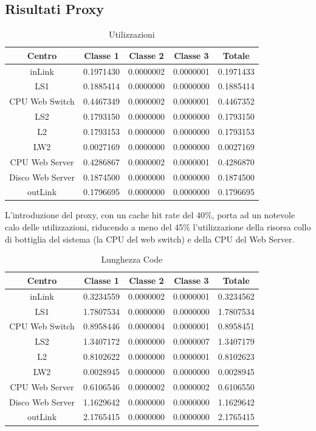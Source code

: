 \subsection{Risultati Proxy}
\begin{table}[htbp]
\begin{center}
\begin{tabular}{|c|c|c|c|c|}
\hline
Centro	&Classe 1	&Classe 2	&Classe 3	&Totale\\
\hline
\hline
inLink & 0.1971430 & 0.0000002 & 0.0000001 & 0.1971433 \\ \hline
LS1 & 0.1885414 & 0.0000000 & 0.0000000 & 0.1885414 \\ \hline
CPU Web Switch & 0.4467349 & 0.0000002 & 0.0000001 & 0.4467352 \\ \hline
LS2 & 0.1793150 & 0.0000000 & 0.0000000 & 0.1793150 \\ \hline
L2 & 0.1793153 & 0.0000000 & 0.0000000 & 0.1793153 \\ \hline
LW2 & 0.0027169 & 0.0000000 & 0.0000000 & 0.0027169 \\ \hline
CPU Web Server & 0.4286867 & 0.0000002 & 0.0000001 & 0.4286870 \\ \hline
Disco Web Server & 0.1874500 & 0.0000000 & 0.0000000 & 0.1874500 \\ \hline
outLink & 0.1796695 & 0.0000000 & 0.0000000 & 0.1796695 \\ \hline
\end{tabular}
\end{center}
\caption{Utilizzazioni}
\label{utilizzazioni}
\end{table}
L'introduzione del proxy, con un cache hit rate del 40\%, porta ad un notevole calo delle utilizzazioni, riducendo a meno del 45\% l'utilizzazione della risorsa collo di bottiglia del sistema (la CPU del web switch) e della CPU del Web Server. 
\begin{table}[htbp]
\begin{center}
\begin{tabular}{|c|c|c|c|c|}
\hline
Centro	&Classe 1	&Classe 2	&Classe 3	&Totale\\
\hline
\hline
inLink & 0.3234559 & 0.0000002 & 0.0000001 & 0.3234562 \\ \hline
LS1 & 1.7807534 & 0.0000000 & 0.0000000 & 1.7807534 \\ \hline
CPU Web Switch & 0.8958446 & 0.0000004 & 0.0000001 & 0.8958451 \\ \hline
LS2 & 1.3407172 & 0.0000000 & 0.0000007 & 1.3407179 \\ \hline
L2 & 0.8102622 & 0.0000000 & 0.0000001 & 0.8102623 \\ \hline
LW2 & 0.0028945 & 0.0000000 & 0.0000000 & 0.0028945 \\ \hline
CPU Web Server & 0.6106546 & 0.0000002 & 0.0000002 & 0.6106550 \\ \hline
Disco Web Server & 1.1629642 & 0.0000000 & 0.0000000 & 1.1629642 \\ \hline
outLink & 2.1765415 & 0.0000000 & 0.0000000 & 2.1765415 \\ \hline
\end{tabular}
\end{center}
\caption{Lunghezza Code}
\label{lunghezzacode}
\end{table}
